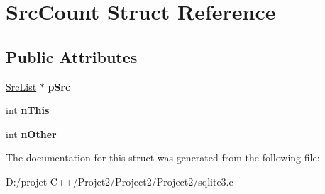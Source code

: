 \hypertarget{struct_src_count}{}\section{Src\+Count Struct Reference}
\label{struct_src_count}
\subsection*{Public Attributes}
\begin{DoxyCompactItemize}
\item 
\mbox{\label{struct_src_count_a7087f00bcaed39cc5032462d7262f4ff}} 
\mbox{\hyperlink{struct_src_list}{Src\+List}} $\ast$ {\bfseries p\+Src}
\item 
\mbox{\label{struct_src_count_a1aaa40ff75460ebc7778ea63aca14d4d}} 
int {\bfseries n\+This}
\item 
\mbox{\label{struct_src_count_a5666f8571b2877fdadfe95364ffb5b80}} 
int {\bfseries n\+Other}
\end{DoxyCompactItemize}


The documentation for this struct was generated from the following file\+:\begin{DoxyCompactItemize}
\item 
D\+:/projet C++/\+Projet2/\+Project2/\+Project2/sqlite3.\+c\end{DoxyCompactItemize}
